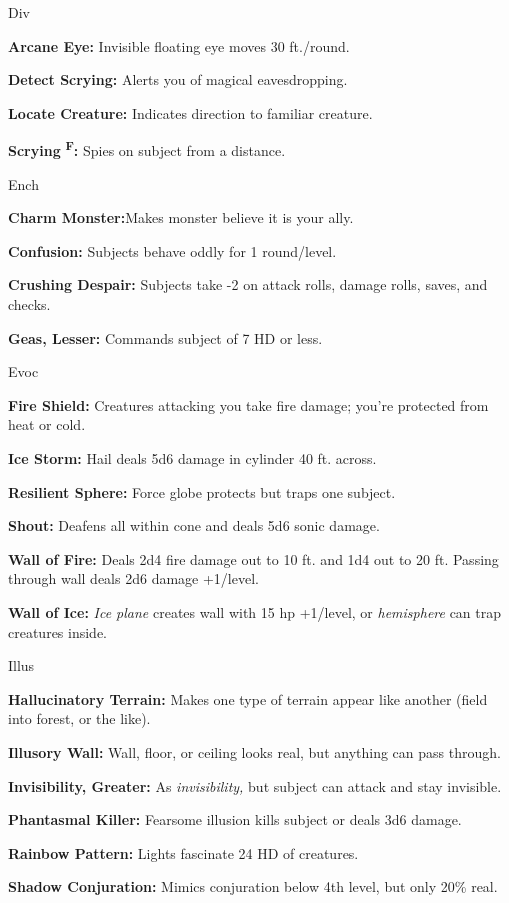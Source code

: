 \documentclass{article}
\begin{document}
Div

\textbf{Arcane Eye:} Invisible floating eye moves 30 ft./round.

\textbf{Detect Scrying:} Alerts you of magical eavesdropping.

\textbf{Locate Creature:} Indicates direction to familiar creature.

\textbf{Scrying }\textsuperscript{\textbf{F}}\textbf{:} Spies on subject from a 
distance.

Ench

\textbf{Charm Monster:}Makes monster believe it is your ally.

\textbf{Confusion:} Subjects behave oddly for 1 round/level.

\textbf{Crushing Despair:} Subjects take -2 on attack rolls, damage rolls, saves, 
and checks.

\textbf{Geas, Lesser:} Commands subject of 7 HD or less.

Evoc

\textbf{Fire Shield:} Creatures attacking you take fire damage; you're protected 
from heat or cold.

\textbf{Ice Storm:} Hail deals 5d6 damage in cylinder 40 ft. across.

\textbf{Resilient Sphere:} Force globe protects but traps one subject.

\textbf{Shout:} Deafens all within cone and deals 5d6 sonic damage.

\textbf{Wall of Fire:} Deals 2d4 fire damage out to 10 ft. and 1d4 out to 20 ft. 
Passing through wall deals 2d6 damage +1/level.

\textbf{Wall of Ice:} \textit{Ice plane }creates wall with 15 hp +1/level, or \textit{hemisphere 
}can trap creatures inside.

Illus

\textbf{Hallucinatory Terrain:} Makes one type of terrain appear like another (field 
into forest, or the like).

\textbf{Illusory Wall:} Wall, floor, or ceiling looks real, but anything can pass 
through.

\textbf{Invisibility, Greater:} As \textit{invisibility, }but subject can attack 
and stay invisible.

\textbf{Phantasmal Killer:} Fearsome illusion kills subject or deals 3d6 damage.

\textbf{Rainbow Pattern:} Lights fascinate 24 HD of creatures.

\textbf{Shadow Conjuration:} Mimics conjuration below 4th level, but only 20\% 
real.
\end{document}
